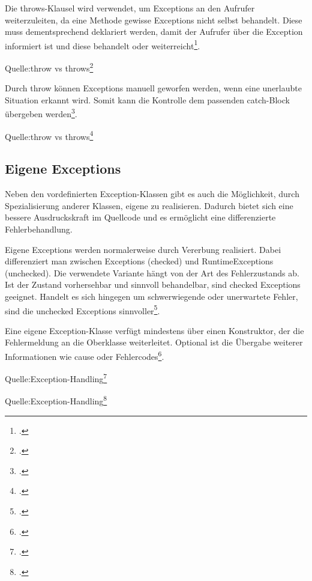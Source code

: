 Die throws-Klausel wird verwendet, um Exceptions an den Aufrufer weiterzuleiten, da eine Methode gewisse Exceptions nicht selbst behandelt. Diese muss dementsprechend deklariert werden, damit der Aufrufer über die Exception informiert ist und diese behandelt oder weiterreicht\footcite[Vgl][]{5_TvT}.


\begin{center}
    \begin{small}
        Quelle:throw vs throws\footcite[][]{5_TvT}
    \end{small}
\end{center} 

Durch throw können Exceptions manuell geworfen werden, wenn eine unerlaubte Situation erkannt wird. Somit kann die Kontrolle dem passenden catch-Block übergeben werden\footcite[Vgl.][]{2_TCJ,5_TvT}.


\begin{center}
    \begin{small}
        Quelle:throw vs throws\footcite[][]{5_TvT}
    \end{small}
\end{center} 

\subsection{Eigene Exceptions}
Neben den vordefinierten Exception-Klassen gibt es auch die Möglichkeit, durch Spezialisierung anderer Klassen, eigene zu realisieren. Dadurch bietet sich eine bessere Ausdruckskraft im Quellcode und es ermöglicht eine differenzierte Fehlerbehandlung.
 
Eigene Exceptions werden normalerweise durch Vererbung realisiert. Dabei differenziert man zwischen Exceptions (checked) und RuntimeExceptions (unchecked). Die verwendete Variante hängt von der Art des Fehlerzustands ab. Ist der Zustand vorhersehbar und sinnvoll behandelbar, sind checked Exceptions geeignet.
Handelt es sich hingegen um schwerwiegende oder unerwartete Fehler, sind die unchecked Exceptions sinnvoller\footcite[Vgl.][]{6_SP,7_CCEJ}.

Eine eigene Exception-Klasse verfügt mindestens über einen Konstruktor, der die Fehlermeldung an die Oberklasse weiterleitet. Optional ist die Übergabe weiterer Informationen wie cause oder Fehlercodes\footcite[Vgl.][]{7_CCEJ,8_JCE}.
\clearpage

\begin{center}
    \begin{small}
        Quelle:Exception-Handling\footcite[][]{4Exp_Hand_b}
    \end{small}
\end{center} 


\begin{center}
    \begin{small}
        Quelle:Exception-Handling\footcite[][]{4Exp_Hand_b}
    \end{small}
\end{center} 
